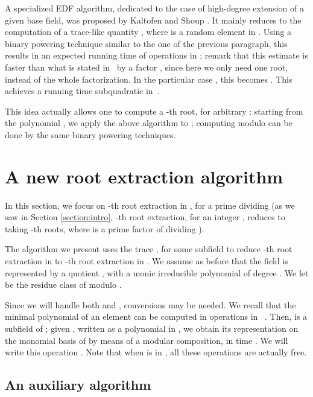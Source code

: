 \documentclass[12pt]{article}
\theoremstyle{plain}
\theoremstyle{definition}
\newcommand{\refsection}[1]{Section \ref{#1}}
\newcounter{algorithm}
\begin{document}
A specialized EDF algorithm, dedicated to the case of high-degree
extension of a given base field, was proposed by Kaltofen and Shoup
\cite{KaltofenShoup1997}. It mainly reduces to the computation of a
trace-like quantity , where  is a
random element in . Using a binary
powering technique similar to the one of the previous paragraph, this
results in an expected running time of  operations in ; remark that this
estimate is faster than what is stated in~\cite{KaltofenShoup1997} by
a factor , since here we only need one root, instead of the
whole factorization. In the particular case , this becomes
. This achieves a running time
subquadratic in~.

This idea actually allows one to compute a -th root, for arbitrary
: starting from the polynomial , we apply the above
algorithm to ; computing  modulo  can
be done by the same binary powering techniques.





\section{A new root extraction algorithm}\label{section:newRootEx}

In this section, we focus on -th root extraction in , for 
a prime dividing  (as we saw in \refsection{section:intro},
-th root extraction, for an integer , reduces to taking 
-th roots, where  is a prime factor of  dividing ).

The algorithm we present uses the trace , for some
subfield  to reduce -th root extraction in
 to -th root extraction in . We assume as before
that the field  is represented by a quotient , with  a monic irreducible polynomial of
degree . We let  be the residue class of  modulo .

Since we will handle both  and , conversions may be
needed. We recall that the minimal polynomial  of an
element  can be computed in 
operations in ~\cite{Shoup1994}. Then,  is a subfield of ; given , written as a polynomial in , we obtain its representation
on the monomial basis of  by means of a modular composition, in
time . We will write this operation .
Note that when  is in , all these operations are actually
free.



\subsection{An auxiliary algorithm}
\end{document}
